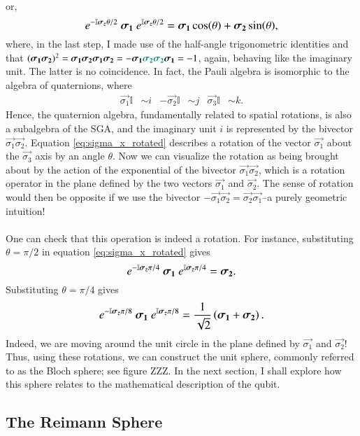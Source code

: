 or,
\begin{equation} \label{eq:sigma_x_rotated}
     \large \exp{ -\mathbb{I} \vec{\sigma_z} \theta / 2} \ \vec{\sigma_1}  \
     \exp{ \mathbb{I} \vec{\sigma_z} \theta / 2} =  \vec{\sigma_1} \cos(\theta) + \vec{\sigma_2} \sin(\theta),
\end{equation}
where, in the last step, I made use of the half-angle trigonometric identities and that $ (\vec{\sigma_1} \vec{\sigma_2} )^2 = \vec{\sigma_1} \vec{\sigma_2} \vec{\sigma_1} \vec{\sigma_2} = - \vec{\sigma_1} \color{teal} \vec{\sigma_2} \vec{\sigma_2} \color{black} \vec{\sigma_1} = -1 $, again, behaving like the imaginary unit. The latter is no coincidence. In fact, the Pauli algebra is isomorphic to the algebra of quaternions, where 
\begin{align*}
    \vec{\sigma_1} \mathbb{I} &\sim i &
    -\vec{\sigma_2} \mathbb{I} & \sim j &
    \vec{\sigma_3} \mathbb{I} &\sim k.
\end{align*}    
Hence, the quaternion algebra, fundamentally related to spatial rotations, is also a subalgebra of the SGA, and the imaginary unit $i$ is represented by the bivector $\vec{\sigma_1} \vec{\sigma_2}$. Equation \eqref{eq:sigma_x_rotated} describes a rotation of the vector $\vec{\sigma_1}$ about the $\vec{\sigma_3}$ axis by an angle $\theta$. Now we can visualize the rotation as being brought about by the action of the exponential of the bivector $\vec{\sigma_1} \vec{\sigma_2}$, which is a rotation operator in the plane defined by the two vectors $\vec{\sigma_1}$ and $\vec{\sigma_2}$. The sense of rotation would then be opposite if we use the bivector $-\vec{\sigma_1} \vec{\sigma_2}= \vec{\sigma_2} \vec{\sigma_1}$--a purely geometric intuition! 
\\ \\ 
One can check that this operation is indeed a rotation. For instance, substituting $\theta = \pi/2$ in equation \eqref{eq:sigma_x_rotated} gives
$$ \large \exp{ -\mathbb{I} \vec{\sigma_z} \pi / 4} \ \vec{\sigma_1}  \ \exp{ \mathbb{I} \vec{\sigma_z} \pi / 4} =  \vec{\sigma_2}. $$
Substituting $\theta = \pi/4$ gives
$$ \large \exp{ -\mathbb{I} \vec{\sigma_z} \pi / 8} \ \vec{\sigma_1}  \ \exp{ \mathbb{I} \vec{\sigma_z} \pi / 8} =  \frac{1}{\sqrt{2}} \left( \vec{\sigma_1} + \vec{\sigma_2} \right). $$
Indeed, we are moving around the unit circle in the plane defined by $\vec{\sigma_1}$ and $\vec{\sigma_2}$! Thus, using these rotations, we can construct the unit sphere, commonly referred to as the Bloch sphere; see figure ZZZ. In the next section, I shall explore how this sphere relates to the mathematical description of the qubit.

\subsection{The Reimann Sphere}



